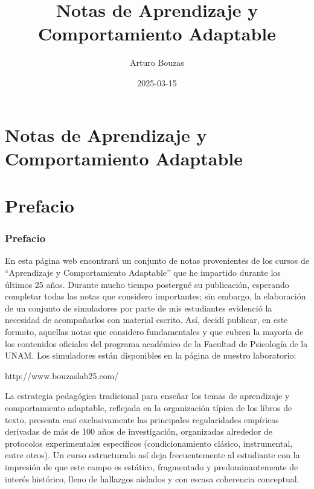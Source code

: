 \documentclass[
  letterpaper,
]{book}
\title{Notas de Aprendizaje y Comportamiento Adaptable}
\author{Arturo Bouzas}
\date{2025-03-15}
\renewcommand*\contentsname{Tabla de contenidos}
\newcommand\contentsname{Tabla de contenidos}
\begin{document}
\frontmatter
\maketitle

\renewcommand*\contentsname{Tabla de contenidos}
{
\hypersetup{linkcolor=}
\setcounter{tocdepth}{2}
\tableofcontents
}

\mainmatter
{}

\chapter{Notas de Aprendizaje y Comportamiento
Adaptable}\label{notas-de-aprendizaje-y-comportamiento-adaptable}


\chapter*{Prefacio}\label{prefacio}


\subsection{Prefacio}\label{prefacio-1}

En esta página web encontrará un conjunto de notas provenientes de los
cursos de ``Aprendizaje y Comportamiento Adaptable'' que he impartido
durante los últimos 25 años. Durante mucho tiempo postergué su
publicación, esperando completar todas las notas que considero
importantes; sin embargo, la elaboración de un conjunto de simuladores
por parte de mis estudiantes evidenció la necesidad de acompañarlos con
material escrito. Así, decidí publicar, en este formato, aquellas notas
que considero fundamentales y que cubren la mayoría de los contenidos
oficiales del programa académico de la Facultad de Psicología de la
UNAM. Los simuladores están disponibles en la página de nuestro
laboratorio:

http://www.bouzaslab25.com/

La estrategia pedagógica tradicional para enseñar los temas de
aprendizaje y comportamiento adaptable, reflejada en la organización
típica de los libros de texto, presenta casi exclusivamente las
principales regularidades empíricas derivadas de más de 100 años de
investigación, organizadas alrededor de protocolos experimentales
específicos (condicionamiento clásico, instrumental, entre otros). Un
curso estructurado así deja frecuentemente al estudiante con la
impresión de que este campo es estático, fragmentado y predominantemente
de interés histórico, lleno de hallazgos aislados y con escasa
coherencia conceptual.
\end{document}
